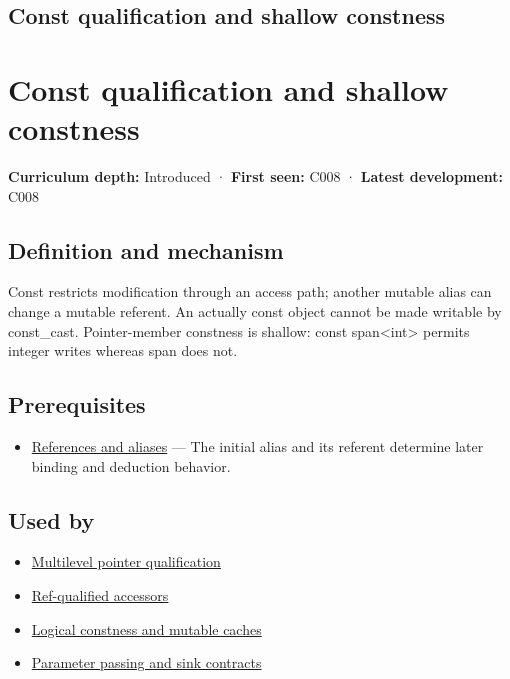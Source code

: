 \hypertarget{appendix-c25d60fed375}{}
\section*{Const qualification and shallow constness}
\chapter{Const qualification and shallow constness}\label{appendix-c25d60fed375-const-qualification-and-shallow-constness}

\textbf{Curriculum depth:} Introduced · \textbf{First seen:} C008 · \textbf{Latest development:} C008

\section{Definition and mechanism}\label{appendix-c25d60fed375-definition-and-mechanism}

Const restricts modification through an access path; another mutable alias can change a mutable referent. An actually const object cannot be made writable by const\_cast. Pointer-member constness is shallow: const span\textless int\textgreater{} permits integer writes whereas span does not.

\section{Prerequisites}\label{appendix-c25d60fed375-prerequisites}

\begin{itemize}
\tightlist
\item
  \hyperref[appendix-d6d562ca9fbb]{References and aliases} --- The initial alias and its referent determine later binding and deduction behavior.
\end{itemize}

\section{Used by}\label{appendix-c25d60fed375-used-by}

\begin{itemize}
\tightlist
\item
  \hyperref[appendix-5e1a7561cd98]{Multilevel pointer qualification}
\item
  \hyperref[appendix-d42039b1d6f7]{Ref-qualified accessors}
\item
  \hyperref[appendix-f5593256bcaf]{Logical constness and mutable caches}
\item
  \hyperref[appendix-d5908f75721f]{Parameter passing and sink contracts}
\end{itemize}

